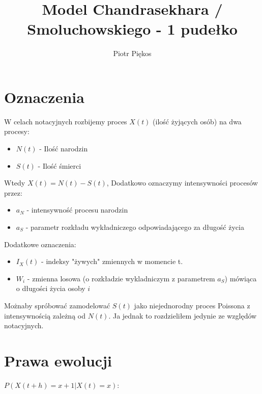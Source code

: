 \documentclass{article}
\begin{document}
\title{Model Chandrasekhara / Smoluchowskiego  - 1 pudełko}
\author{Piotr Piękos}

\maketitle

\section{Oznaczenia}
W celach notacyjnych rozbijemy proces $X(t)$ (ilość żyjących osób) na dwa procesy: 
\begin{itemize}
\item$N(t)$ - Ilość narodzin
\item$S(t)$ - Ilość śmierci
\end{itemize}
Wtedy $X(t) = N(t) - S(t)$,
Dodatkowo oznaczymy intensywności procesów przez:
\begin{itemize}
\item$a_N$ - intensywność procesu narodzin
\item$a_S$ - parametr rozkładu wykładniczego odpowiadającego za długość życia
\end{itemize}
Dodatkowe oznaczenia:
\begin{itemize}
\item$I_X(t)$ - indeksy "żywych" zmiennych w momencie t.
\item$W_i$ - zmienna losowa (o rozkładzie wykladniczym z parametrem $a_S$) mówiąca o długości życia osoby $i$
\end{itemize}

Możnaby spróbować zamodelować $S(t)$ jako niejednorodny proces Poissona z intensywnością zależną od $N(t)$. Ja jednak to rozdzieliłem jedynie ze względów notacyjnych.

\section{Prawa ewolucji}
$P(X(t+h) = x + 1 | X(t) = x)$:
\end{document}
